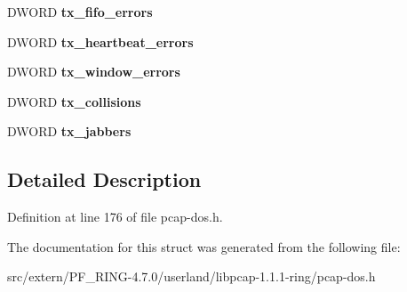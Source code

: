 \begin{DoxyCompactItemize}
\item 
\hypertarget{structnet__device__stats_a4c2dbec492e18827e875a0ff40830edf}{
DWORD {\bfseries tx\_\-fifo\_\-errors}}
\label{structnet__device__stats_a4c2dbec492e18827e875a0ff40830edf}

\item 
\hypertarget{structnet__device__stats_aae0c22f777a8631290b2c7abd1aabe06}{
DWORD {\bfseries tx\_\-heartbeat\_\-errors}}
\label{structnet__device__stats_aae0c22f777a8631290b2c7abd1aabe06}

\item 
\hypertarget{structnet__device__stats_a8330a63e37b349f0350405431b8d8ed0}{
DWORD {\bfseries tx\_\-window\_\-errors}}
\label{structnet__device__stats_a8330a63e37b349f0350405431b8d8ed0}

\item 
\hypertarget{structnet__device__stats_aa224515d80bfda0fbc29baa4d7104b8e}{
DWORD {\bfseries tx\_\-collisions}}
\label{structnet__device__stats_aa224515d80bfda0fbc29baa4d7104b8e}

\item 
\hypertarget{structnet__device__stats_a5741b79ea00be464b9004d5d40510290}{
DWORD {\bfseries tx\_\-jabbers}}
\label{structnet__device__stats_a5741b79ea00be464b9004d5d40510290}

\end{DoxyCompactItemize}


\subsection{Detailed Description}


Definition at line 176 of file pcap-\/dos.h.



The documentation for this struct was generated from the following file:\begin{DoxyCompactItemize}
\item 
src/extern/PF\_\-RING-\/4.7.0/userland/libpcap-\/1.1.1-\/ring/pcap-\/dos.h\end{DoxyCompactItemize}
